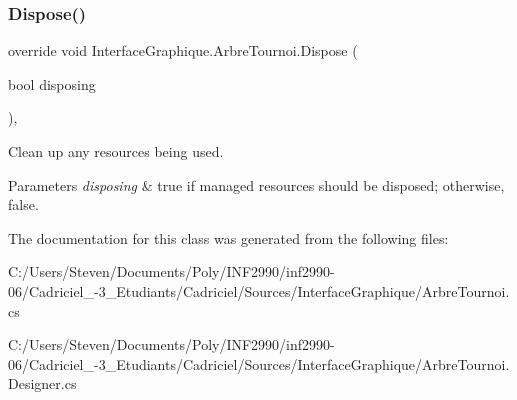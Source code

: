 \subsubsection{\texorpdfstring{Dispose()}{Dispose()}}
{\footnotesize\ttfamily override void Interface\+Graphique.\+Arbre\+Tournoi.\+Dispose (\begin{DoxyParamCaption}\item[{bool}]{disposing }\end{DoxyParamCaption})\hspace{0.3cm}{\ttfamily [inline]}, {\ttfamily [protected]}}



Clean up any resources being used. 


\begin{DoxyParams}{Parameters}
{\em disposing} & true if managed resources should be disposed; otherwise, false.\\
\hline
\end{DoxyParams}


The documentation for this class was generated from the following files\+:\begin{DoxyCompactItemize}
\item 
C\+:/\+Users/\+Steven/\+Documents/\+Poly/\+I\+N\+F2990/inf2990-\/06/\+Cadriciel\+\_-\/3\+\_\+\+Etudiants/\+Cadriciel/\+Sources/\+Interface\+Graphique/Arbre\+Tournoi.\+cs\item 
C\+:/\+Users/\+Steven/\+Documents/\+Poly/\+I\+N\+F2990/inf2990-\/06/\+Cadriciel\+\_-\/3\+\_\+\+Etudiants/\+Cadriciel/\+Sources/\+Interface\+Graphique/Arbre\+Tournoi.\+Designer.\+cs\end{DoxyCompactItemize}

